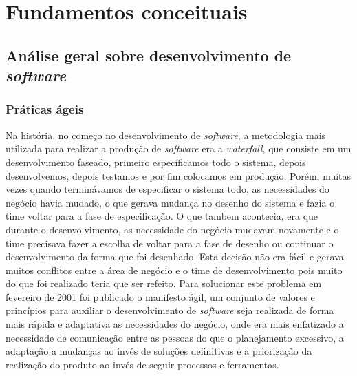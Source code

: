 \part{Fundamentos conceituais}
  \chapter{Análise geral sobre desenvolvimento de \textit{software}}

    \section{Práticas ágeis}
      Na história, no começo no desenvolvimento de \textit{software}, a metodologia
      mais utilizada para realizar a produção de \textit{software} era a \textit{waterfall},
      que consiste em um desenvolvimento faseado, primeiro específicamos todo o sistema,
      depois desenvolvemos, depois testamos e por fim colocamos em produção. Porém,
      muitas vezes quando terminávamos de especificar o sistema todo, as necessidades
      do negócio havia mudado, o que gerava mudança no desenho do sistema e fazia
      o time voltar para a fase de especificação. O que tambem acontecia, era que
      durante o desenvolvimento, as necessidade do negócio mudavam novamente e
      o time precisava fazer a escolha de voltar para a fase de desenho ou continuar
      o desenvolvimento da forma que foi desenhado. Esta decisão não era fácil e
      gerava muitos conflitos entre a área de negócio e o time de desenvolvimento
      pois muito do que foi realizado teria que ser refeito. \newline
      Para solucionar este problema em fevereiro de 2001 foi publicado o manifesto
      ágil, um conjunto de valores e princípios para auxiliar o desenvolvimento de
      \textit{software} seja realizada de forma mais rápida e adaptativa as
      necessidades do negócio, onde era mais enfatizado a necessidade de comunicação
      entre as pessoas do que o planejamento excessivo, a adaptação a mudanças ao
      invés de soluções definitivas e a priorização da realização do produto ao
      invés de seguir processos e ferramentas.

